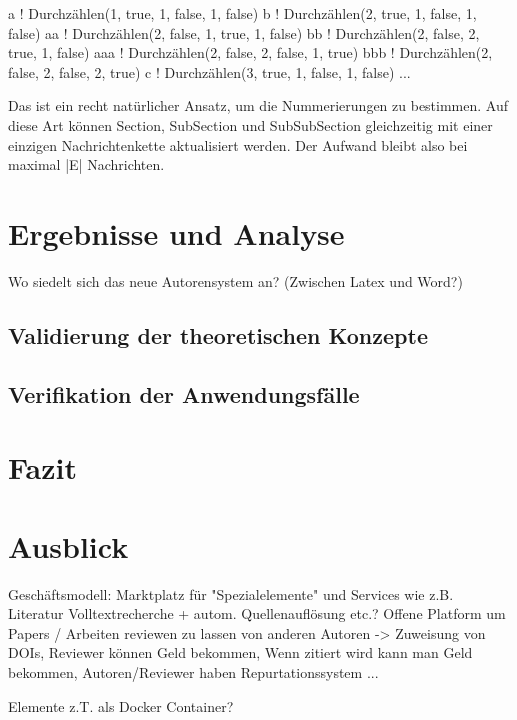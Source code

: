 a ! Durchzählen(1, true, 1, false, 1, false)
b ! Durchzählen(2, true, 1, false, 1, false)
aa ! Durchzählen(2, false, 1, true, 1, false)
bb ! Durchzählen(2, false, 2, true, 1, false)
aaa ! Durchzählen(2, false, 2, false, 1, true)
bbb ! Durchzählen(2, false, 2, false, 2, true)
c ! Durchzählen(3, true, 1, false, 1, false)
...

Das ist ein recht natürlicher Ansatz, um die Nummerierungen zu bestimmen.
Auf diese Art können Section, SubSection und SubSubSection gleichzeitig
mit einer einzigen Nachrichtenkette aktualisiert werden.
Der Aufwand bleibt also bei maximal |E| Nachrichten.


\chapter{Ergebnisse und Analyse}

Wo siedelt sich das neue Autorensystem an? (Zwischen Latex und Word?)

\section{Validierung der theoretischen Konzepte}

\section{Verifikation der Anwendungsfälle}


\chapter{Fazit}


\chapter{Ausblick}

Geschäftsmodell: Marktplatz für "Spezialelemente" und Services wie z.B. Literatur Volltextrecherche + autom. Quellenauflösung etc.? Offene Platform um Papers / Arbeiten reviewen zu lassen von anderen Autoren -> Zuweisung von DOIs, Reviewer können Geld bekommen, Wenn zitiert wird kann man Geld bekommen, Autoren/Reviewer haben Repurtationssystem ...

Elemente z.T. als Docker Container?


